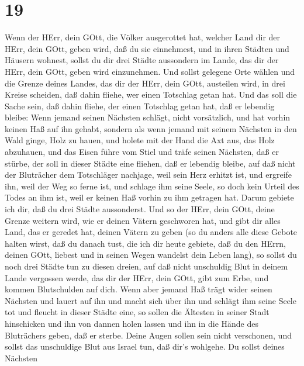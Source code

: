 \hypertarget{section-18}{%
\section{19}\label{section-18}}

 Wenn der HErr, dein GOtt, die Völker ausgerottet hat,
welcher Land dir der HErr, dein GOtt, geben wird, daß du sie einnehmest,
und in ihren Städten und Häusern wohnest,  sollst du dir
drei Städte aussondern im Lande, das dir der HErr, dein GOtt, geben wird
einzunehmen.  Und sollst gelegene Orte wählen und die Grenze
deines Landes, das dir der HErr, dein GOtt, austeilen wird, in drei
Kreise scheiden, daß dahin fliehe, wer einen Totschlag getan hat.
 Und das soll die Sache sein, daß dahin fliehe, der einen
Totschlag getan hat, daß er lebendig bleibe: Wenn jemand seinen Nächsten
schlägt, nicht vorsätzlich, und hat vorhin keinen Haß auf ihn gehabt,
 sondern als wenn jemand mit seinem Nächsten in den Wald
ginge, Holz zu hauen, und holete mit der Hand die Axt aus, das Holz
abzuhauen, und das Eisen führe vom Stiel und träfe seinen Nächsten, daß
er stürbe, der soll in dieser Städte eine fliehen, daß er lebendig
bleibe,  auf daß nicht der Bluträcher dem Totschläger
nachjage, weil sein Herz erhitzt ist, und ergreife ihn, weil der Weg so
ferne ist, und schlage ihm seine Seele, so doch kein Urteil des Todes an
ihm ist, weil er keinen Haß vorhin zu ihm getragen hat. 
Darum gebiete ich dir, daß du drei Städte aussonderst.  Und
so der HErr, dein GOtt, deine Grenze weitern wird, wie er deinen Vätern
geschworen hat, und gibt dir alles Land, das er geredet hat, deinen
Vätern zu geben  (so du anders alle diese Gebote halten
wirst, daß du danach tust, die ich dir heute gebiete, daß du den HErrn,
deinen GOtt, liebest und in seinen Wegen wandelst dein Leben lang), so
sollst du noch drei Städte tun zu diesen dreien,  auf daß
nicht unschuldig Blut in deinem Lande vergossen werde, das dir der HErr,
dein GOtt, gibt zum Erbe, und kommen Blutschulden auf dich.
 Wenn aber jemand Haß trägt wider seinen Nächsten und
lauert auf ihn und macht sich über ihn und schlägt ihm seine Seele tot
und fleucht in dieser Städte eine,  so sollen die Ältesten
in seiner Stadt hinschicken und ihn von dannen holen lassen und ihn in
die Hände des Bluträchers geben, daß er sterbe.  Deine
Augen sollen sein nicht verschonen, und sollst das unschuldige Blut aus
Israel tun, daß dir's wohlgehe.  Du sollst deines Nächsten
